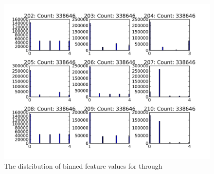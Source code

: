 \begin{figure}[ht!]
  \caption{The distribution of binned feature values for  through }\label{fig:features_bin_5_20_28}
  \centering
    \includegraphics[width=1.0\textwidth]{figures/feature_distributions/features_bin_5_20_28.png}
\end{figure}
